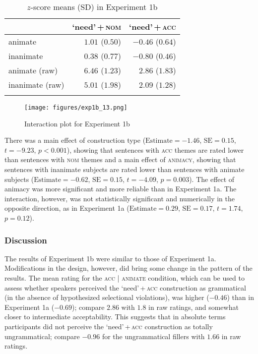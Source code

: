 \documentclass[output=paper]{langscibook}
\begin{document}
\begin{table}
\centering
\begin{tabular}{lrr}
\lsptoprule
   & `need'\,+\,\textsc{nom} & `need'\,+\,\textsc{acc}\\
\midrule
animate  &  $1.01$ ($0.50$) &   $-0.46$ ($0.64$)\\
inanimate  & $0.38$ ($0.77$) &   $-0.80$ ($0.46$)\\
animate (raw)  &   $6.46$ ($1.23$) &  $2.86$ ($1.83$)\\
inanimate (raw)  &   $5.01$ ($1.98$) & $2.09$ ($1.28$)\\
\lspbottomrule
\end{tabular}
\caption{$z$-score means (SD) in Experiment 1b}
\label{tab:1:means-exp1b}
\end{table}

\begin{figure}
\caption{Interaction plot for Experiment 1b}
\centering
\texttt{[image: figures/exp1b\_13.png]}
\label{fig:exp1b}
\end{figure}

There was a main effect of construction type ($\text{Estimate} = -1.46$, $\text{SE} = 0.15$, $t = -9.23$, $p < 0.001$), showing that sentences with \textsc{acc} themes are rated lower than sentences with \textsc{nom} themes and a main effect of \textsc{animacy}, showing that sentences with inanimate subjects are rated lower than sentences with animate subjects ($\text{Estimate} = -0.62$, $\text{SE} = 0.15$, $t = -4.09$, $p = 0.003$). The effect of animacy was more significant and more reliable than in Experiment 1a. The interaction, however, was not statistically significant and numerically in the opposite direction, as in Experiment 1a ($\text{Estimate} = 0.29$, $\text{SE} = 0.17$, $t = 1.74$, $p = 0.12$).

\subsubsection{Discussion}

The results of Experiment 1b were similar to those of Experiment 1a. Modifications in the design, however, did bring some change in the pattern of the results. The mean rating for the \textsc{acc} | \textsc{animate} condition, which can be used to assess whether speakers perceived the `need'\,+\,\textsc{acc} construction as grammatical (in the absence of hypothesized selectional violations), was higher ($-0.46$) than in Experiment 1a ($-0.69$); compare $2.86$ with $1.8$ in raw ratings, and somewhat closer to intermediate acceptability. This suggests that in absolute terms participants did not perceive the `need'\,+\,\textsc{acc} construction as totally ungrammatical; compare $-0.96$ for the ungrammatical fillers with $1.66$ in raw ratings.
\end{document}
